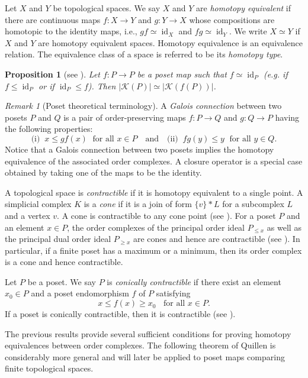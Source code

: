 \documentclass[a4paper,11pt]{article}
\newtheorem{proposition}[proposition]{Proposition}
\theoremstyle{definition}
\theoremstyle{remark}
\newtheorem{remark}[remark]{Remark}
\DeclareMathOperator{\id}{id}
\begin{document}
Let $X$ and $Y$ be topological spaces. We say $X$ and $Y$ are \emph{homotopy equivalent} if there are continuous maps $f\colon X\to Y$ and $g\colon Y\to X$ whose compositions are homotopic to the identity maps, i.e., $gf\simeq \id_X$ and $fg\simeq \id_Y$. We write $X\simeq Y$ if $X$ and $Y$ are homotopy equivalent spaces. Homotopy equivalence is an equivalence relation. The equivalence class of a space is referred to be its \emph{homotopy type}.

\begin{proposition}[see {\cite[Proposition~3.1.12]{Smi11}}]
  Let $f\colon P\to P$ be a poset map such that $f\simeq \id_{P}$ (e.g. if $f\leq \id_{P}$ or if $\id_{P}\leq f$). Then $|\mathcal{K}(P)|\simeq |\mathcal{K}(f(P))|$.
\end{proposition}

\begin{remark}[Poset theoretical terminology]
  A \emph{Galois connection} between two posets $P$ and $Q$ is a pair of order-preserving maps $f\colon P\to Q$ and $g\colon Q\to P$ having the following properties:
$$ \text{(i)}\;\; x\leq gf(x)\; \text{ for all } x\in P\quad \text{and}\quad \text{(ii)}\;\; fg(y)\leq y\; \text{ for all } y\in Q. $$
Notice that a Galois connection between two posets implies the homotopy equivalence of the associated order complexes. A closure operator is a special case obtained by taking one of the maps to be the identity.
\end{remark}

A topological space is \emph{contractible} if it is homotopy equivalent to a single point. A simplicial complex $K$ is a \emph{cone} if it is a join of form $\{v\}*L$ for a subcomplex $L$ and a vertex $v$. A cone is contractible to any cone point (see \cite[Lemma~3.2.2]{Smi11}). For a poset $P$ and an element $x\in P$, the order complexes of the principal order ideal $P_{\leq x}$ as well as the principal dual order ideal $P_{\geq x}$ are cones and hence are contractible (see \cite[Lemma~3.2.3]{Smi11}). In particular, if a finite poset has a maximum or a minimum, then its order complex is a cone and hence contractible.


Let $P$ be a poset. We say $P$ is \emph{conically contractible} if there exist an element $x_0\in P$ and a poset endomorphism $f$ of $P$ satisfying $$ x\leq f(x) \geq x_0\;\;\text{ for all } x\in P. $$
If a poset is conically contractible, then it is contractible (see \cite[Lemma~3.3.3]{Smi11}).

The previous results provide several sufficient conditions for proving homotopy equivalences between order complexes. The following theorem of Quillen is considerably more general and will later be applied to poset maps comparing finite topological spaces.
\end{document}
